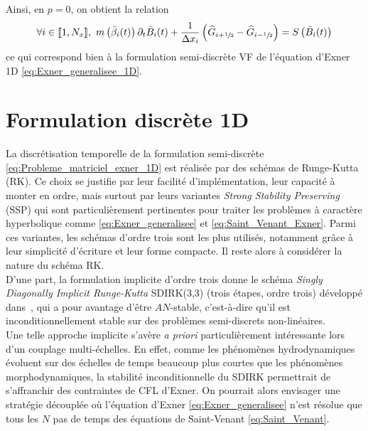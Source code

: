 \documentclass[11pt, a4paper, oneside]{report}
\begin{document}
Ainsi, en $p = 0$, on obtient la relation
\begin{equation}
    \forall i \in \llbracket 1, N_x \rrbracket, ~ m \left( \bar{\beta}_i(t) \right) \partial_t \bar{B}_i(t) + \frac{1}{\Delta x_i} \left( \widehat{G}_{i+\sfrac{1}{2}} - \widehat{G}_{i-\sfrac{1}{2}} \right) = S \left( \bar{B}_i(t) \right)
\end{equation}
ce qui correspond bien à la formulation semi-discrète VF de l'équation d'Exner 1D \eqref{eq:Exner_generalisee_1D}.

\section{Formulation discrète 1D} \label{sec:Formulation_discrete_1D}

La discrétisation temporelle de la formulation semi-discrète \eqref{eq:Probleme_matriciel_exner_1D} est réalisée par des schémas de Runge-Kutta (RK). Ce choix se justifie par leur facilité d'implémentation, leur capacité à monter en ordre, mais surtout par leurs variantes \textit{Strong Stability Preserving} (SSP) qui sont particulièrement pertinentes pour traiter les problèmes à caractère hyperbolique comme \eqref{eq:Exner_generalisee} et \eqref{eq:Saint_Venant_Exner}. Parmi ces variantes, les schémas d'ordre trois sont les plus utilisés, notamment grâce à leur simplicité d'écriture et leur forme compacte. Il reste alors à considérer la nature du schéma RK.\\

D'une part, la formulation implicite d'ordre trois donne le schéma \textit{Singly Diagonally Implicit Runge-Kutta} SDIRK(3,3) (trois étapes, ordre trois) développé dans~\cite{norsett1984embedded}, qui a pour avantage d'être $AN$-stable, c'est-à-dire qu'il est inconditionnellement stable sur des problèmes semi-discrets non-linéaires. \\ Une telle approche implicite s'avère \textit{a priori} particulièrement intéressante lors d'un couplage multi-échelles. En effet, comme les phénomènes hydrodynamiques évoluent sur des échelles de temps beaucoup plus courtes que les phénomènes morphodynamiques, la stabilité inconditionnelle du SDIRK permettrait de s'affranchir des contraintes de CFL d'Exner. On pourrait alors envisager une stratégie découplée où l'équation d'Exner \eqref{eq:Exner_generalisee} n'est résolue que tous les $N$ pas de temps des équations de Saint-Venant \eqref{eq:Saint_Venant}.
\end{document}
